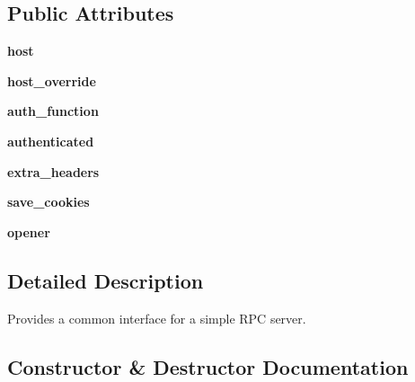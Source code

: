 \subsection*{Public Attributes}
\begin{DoxyCompactItemize}
\item 
\mbox{\label{classupload_1_1_abstract_rpc_server_ab7188d827e2faddcf970f524f5856192}} 
{\bfseries host}
\item 
\mbox{\label{classupload_1_1_abstract_rpc_server_a783a4a7e4ffb776a57a3f267300a213b}} 
{\bfseries host\+\_\+override}
\item 
\mbox{\label{classupload_1_1_abstract_rpc_server_aee0090a3bcf07b913a7dd596a5dabb8f}} 
{\bfseries auth\+\_\+function}
\item 
\mbox{\label{classupload_1_1_abstract_rpc_server_a692955750c802e461c6336d3000cd365}} 
{\bfseries authenticated}
\item 
\mbox{\label{classupload_1_1_abstract_rpc_server_adbbf0109afc13d58d7815fa143cb779f}} 
{\bfseries extra\+\_\+headers}
\item 
\mbox{\label{classupload_1_1_abstract_rpc_server_affe342205c4647d41b127f5a5634858b}} 
{\bfseries save\+\_\+cookies}
\item 
\mbox{\label{classupload_1_1_abstract_rpc_server_aa931446476e0e86f3ade7fef0a0aea5a}} 
{\bfseries opener}
\end{DoxyCompactItemize}


\subsection{Detailed Description}
\begin{DoxyVerb}Provides a common interface for a simple RPC server.\end{DoxyVerb}
 

\subsection{Constructor \& Destructor Documentation}
\mbox{\label{classupload_1_1_abstract_rpc_server_a3f6bc1bd16b52bd5a5c33a1fedeef2d0}} 
